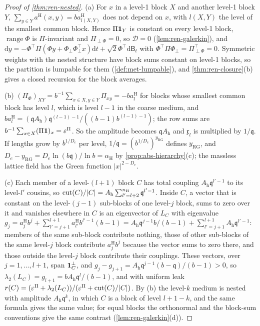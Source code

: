 \begin{proof}[Proof of \cref{thm:ren-nested}]
(a) For $x$ in a level-1 block $X$ and another level-1 block $Y$, $\sum_{y\in Y}a^{\mathrm H}(x,y)=ba^{\mathrm H}_{l(X,Y)}$ does not depend on $x$, with $l(X,Y)$ the level of the smallest common block. Hence $\Pi\mathbf{1}_Y$ is constant on every level-1 block, $\operatorname{range}\Phi$ is $\Pi$-invariant and $\Pi_{\perp\Phi}=0$, so $\mathcal D=0$ (\cref{lem:ren-galerkin}), and $\mathrm dy=-\Phi^\top\Pi(\Phi y+\Phi_\perp\Phi_\perp^\top x)\mathrm dt+\sqrt2\Phi^\top\mathrm d\mathsf B_t$ with $\Phi^\top\Pi\Phi_\perp=\Pi_{\perp\Phi}^\top=0$. Symmetric weights with the nested structure have block sums constant on level-1 blocks, so the partition is lumpable for them (\cref{def:met-lumpable}), and \cref{thm:ren-closure}(b) gives a closed recursion for the block averages.

(b) $(\Pi_\Phi)_{XY}=b^{-1}\sum_{x\in X,y\in Y}\Pi_{xy}=-ba^{\mathrm H}_l$ for blocks whose smallest common block has level $l$, which is level $l-1$ in the coarse medium, and $ba^{\mathrm H}_l=(\mathfrak qA_{\mathrm h})\mathfrak q^{(l-1)-1}/((b-1)b^{(l-1)-1})$; the row sums are $b^{-1}\sum_{x\in X}(\Pi\mathbf{1})_x=\varepsilon^\Pi$. So the amplitude becomes $\mathfrak qA_{\mathrm h}$ and $\mathfrak x_l$ is multiplied by $1/\mathfrak q$. If lengths grow by $b^{1/D_e}$ per level, $1/\mathfrak q=(b^{1/D_e})^{y_{\mathrm{RG}}}$ defines $y_{\mathrm{RG}}$, and $D_e-y_{\mathrm{RG}}=D_e\ln(b\mathfrak q)/\ln b=\alpha_{\mathrm H}$ by \cref{prop:abs-hierarchy}(c); the massless lattice field has the Green function $\lvert x\rvert^{2-D_e}$.

(c) Each member of a level-$(l+1)$ block $C$ has total coupling $A_{\mathrm h}\mathfrak q^{l'-1}$ to its level-$l'$ cousins, so $\operatorname{cut}(C)/\lvert C\rvert=A_{\mathrm h}\sum_{l'=l+2}^{n_{\mathrm H}}\mathfrak q^{l'-1}$. Inside $C$, a vector that is constant on the level-$(j-1)$ sub-blocks of one level-$j$ block, sums to zero over it and vanishes elsewhere in $C$ is an eigenvector of $L_C$ with eigenvalue $g_j=a^{\mathrm H}_jb^j+\sum_{l'=j+1}^{l+1}a^{\mathrm H}_{l'}b^{l'-1}(b-1)=A_{\mathrm h}\mathfrak q^{j-1}b/(b-1)+\sum_{l'=j+1}^{l+1}A_{\mathrm h}\mathfrak q^{l'-1}$: members of the same sub-block contribute nothing, those of other sub-blocks of the same level-$j$ block contribute $a^{\mathrm H}_jb^j$ because the vector sums to zero there, and those outside the level-$j$ block contribute their couplings. These vectors, over $j=1,\dots,l+1$, span $\mathbf{1}_C^\perp$, and $g_j-g_{j+1}=A_{\mathrm h}\mathfrak q^{j-1}(b-\mathfrak q)/(b-1)>0$, so $\lambda_2(L_C)=g_{l+1}=bA_{\mathrm h}\mathfrak q^l/(b-1)$, and with uniform leak $r(C)=(\varepsilon^\Pi+\lambda_2(L_C))/(\varepsilon^\Pi+\operatorname{cut}(C)/\lvert C\rvert)$. By (b) the level-$k$ medium is nested with amplitude $A_{\mathrm h}\mathfrak q^k$, in which $C$ is a block of level $l+1-k$, and the same formula gives the same value; for equal blocks the orthonormal and the block-sum conventions give the same contrast (\cref{lem:ren-galerkin}(d)).


\end{proof}
